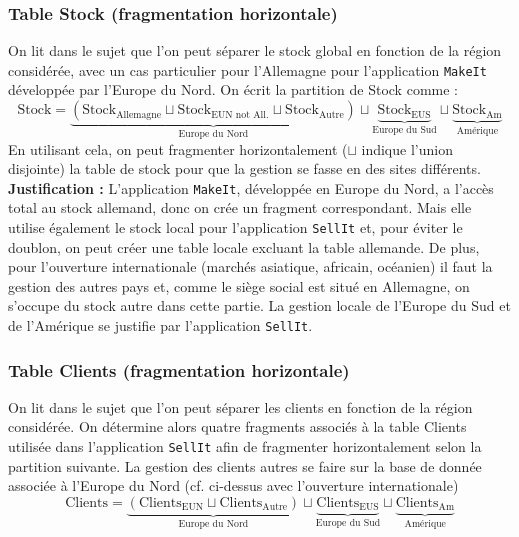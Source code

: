 \documentclass[10pt,a4paper]{article}
\theoremstyle{plain}
\begin{document}
\subsubsection{Table Stock (fragmentation horizontale)}
On lit dans le sujet que l'on peut séparer le stock global en fonction de la région considérée, avec un cas particulier pour l'Allemagne pour l'application \verb|MakeIt| développée par l'Europe du Nord. On écrit la partition de Stock comme :
\[\text{Stock}=\underbrace{(\text{Stock}_{\text{Allemagne}}\sqcup\text{Stock}_{\text{EUN not All.}}\sqcup\text{Stock}_{\text{Autre}})}_{\text{Europe du Nord}}\sqcup\underbrace{\text{Stock}_{\text{EUS}}}_{\text{Europe du Sud}}\sqcup\underbrace{\text{Stock}_{\text{Am}}}_{\text{Amérique}}\]
En utilisant cela, on peut fragmenter horizontalement ($\sqcup$ indique l'union disjointe) la table de stock pour que la gestion se fasse en des sites différents.\\
\textbf{Justification :} L'application \verb|MakeIt|, développée en Europe du Nord, a l'accès total au stock allemand, donc on crée un fragment correspondant. Mais elle utilise également le stock local pour l'application \verb|SellIt| et, pour éviter le doublon, on peut créer une table locale excluant la table allemande. De plus, pour l'ouverture internationale (marchés asiatique, africain, océanien) il faut la gestion des autres pays et, comme le siège social est situé en Allemagne, on s'occupe du stock autre dans cette partie. La gestion locale de l'Europe du Sud et de l'Amérique se justifie par l'application \verb|SellIt|. 

\subsubsection{Table Clients (fragmentation horizontale)}
On lit dans le sujet que l'on peut séparer les clients en fonction de la région considérée. On détermine alors quatre fragments associés à la table Clients utilisée dans l'application \verb|SellIt| afin de fragmenter horizontalement selon la partition suivante. La gestion des clients autres se faire sur la base de donnée associée à l'Europe du Nord (cf. ci-dessus avec l'ouverture internationale)
\[\text{Clients}=\underbrace{(\text{Clients}_{\text{EUN}}\sqcup\text{Clients}_{\text{Autre}})}_{\text{Europe du Nord}}\sqcup\underbrace{\text{Clients}_{\text{EUS}}}_{\text{Europe du Sud}}\sqcup\underbrace{\text{Clients}_{\text{Am}}}_{\text{Amérique}}\]
\end{document}
